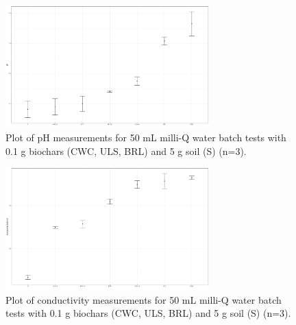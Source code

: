 \begin{figure} 
\centering
\includegraphics[width=0.7\textwidth]{R/figs/pH.pdf}
\caption{Plot of pH measurements for 50 mL milli-Q water batch tests with 0.1 g biochars (CWC, ULS, BRL) and 5 g soil (S) (n=3).}
\label{appfig:pH}
\end{figure}

\begin{figure} 
\centering
\includegraphics[width=0.7\textwidth]{R/figs/conductivity.pdf}
\caption{Plot of conductivity measurements for 50 mL milli-Q water batch tests with 0.1 g biochars (CWC, ULS, BRL) and 5 g soil (S) (n=3).}
\label{appfig:cond}
\end{figure}
